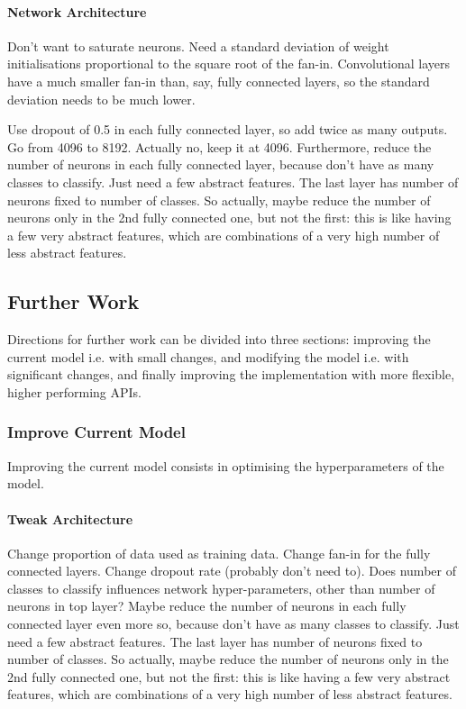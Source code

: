 \documentclass[a4paper,11pt]{article}
\begin{document}
\paragraph{Network Architecture}

Don't want to saturate neurons. Need a standard deviation of weight initialisations proportional to the square root of the fan-in. Convolutional layers have a much smaller fan-in than, say, fully connected layers, so the standard deviation needs to be much lower.

Use dropout of 0.5 in each fully connected layer, so add twice as many outputs. Go from 4096 to 8192. Actually no, keep it at 4096. Furthermore, reduce the number of neurons in each fully connected layer, because don't have as many classes to classify. Just need a few abstract features. The last layer has number of neurons fixed to number of classes. So actually, maybe reduce the number of neurons only in the 2nd fully connected one, but not the first: this is like having a few very abstract features, which are combinations of a very high number of less abstract features.


\subsection{Further Work}

Directions for further work can be divided into three sections: improving the current model i.e. with small changes, and modifying the model i.e. with significant changes, and finally improving the implementation with more flexible, higher performing APIs.

\subsubsection{Improve Current Model}

Improving the current model consists in optimising the hyperparameters of the model.

\paragraph{Tweak Architecture}

Change proportion of data used as training data.
Change fan-in for the fully connected layers.
Change dropout rate (probably don't need to).
Does number of classes to classify influences network hyper-parameters, other than number of neurons in top layer?
Maybe reduce the number of neurons in each fully connected layer even more so, because don't have as many classes to classify. Just need a few abstract features. The last layer has number of neurons fixed to number of classes. So actually, maybe reduce the number of neurons only in the 2nd fully connected one, but not the first: this is like having a few very abstract features, which are combinations of a very high number of less abstract features.
\end{document}
